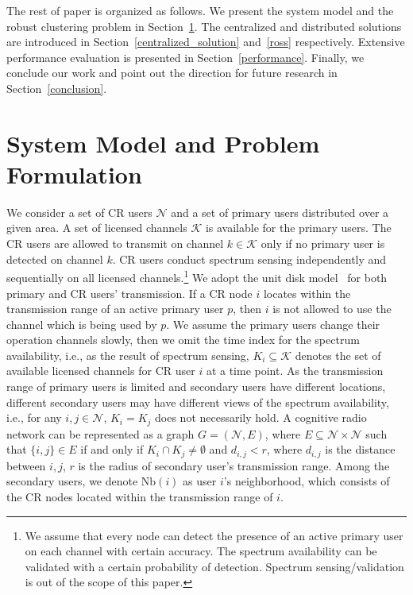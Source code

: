 \documentclass[10pt,journal,compsoc]{IEEEtran}
\theoremstyle{mytheoremstyle}
\theoremstyle{mytheoremstyle}
\theoremstyle{mytheoremstyle}
\newcommand{\ie}{i.e., }
\begin{document}
The rest of paper is organized as follows. 
We present the system model and the robust clustering problem in Section~\ref{sec:model}. 
The centralized and distributed solutions are introduced in Section~\ref{centralized_solution} and~\ref{ross} respectively.
Extensive performance evaluation is presented in Section~\ref{performance}.
Finally, we conclude our work and point out the direction for future research in Section~\ref{conclusion}.



\section{System Model and Problem Formulation}
\label{sec:model}

We consider a set of CR users $\mathcal{N}$ and a set of primary users distributed over a given area.
A set of licensed channels $\mathcal{K}$ is available for the primary users. 
The CR users are allowed to transmit on channel $k \in \mathcal{K}$ only if no primary user is detected on channel $k$. 
CR users conduct spectrum sensing independently and sequentially on all licensed channels.\footnote{We assume that every node can detect the presence of an active primary user on each channel with certain accuracy. The spectrum availability can be validated with a certain probability of detection. Spectrum sensing/validation is out of the scope of this paper.}
We adopt the unit disk model~\cite{unitDiskModel} for both primary and CR users' transmission.
If a CR node $i$ locates within the transmission range of an active primary user $p$, then $i$ is not allowed to use the channel which is being used by $p$.
We assume the primary users change their operation channels slowly, then we omit the time index for the spectrum availability, \ie as the result of spectrum sensing, $K_i \subseteq \mathcal{K}$ denotes the set of available licensed channels for CR user $i$ at a time point.
As the transmission range of primary users is limited and secondary users have different locations, different secondary users may have different views of the spectrum availability, i.e., for any $i, j \in \mathcal{N}$, $K_i = K_{j}$ does not necessarily hold.
A cognitive radio network can be represented as a graph $G = (\mathcal{N}, E)$, where $E \subseteq \mathcal{N} \times \mathcal{N}$ such that $\{i, j\} \in E$ if and only if $K_{i} \cap K_{j}\neq \emptyset$ and $d_{i,j} < r$, where $d_{i,j}$ is the distance between $i, j$, $r$ is the radius of secondary user's transmission range. 
%
Among the secondary users, we denote $\text{Nb}(i)$ as user $i$'s neighborhood, which consists of the CR nodes located within the transmission range of $i$. 
\end{document}
